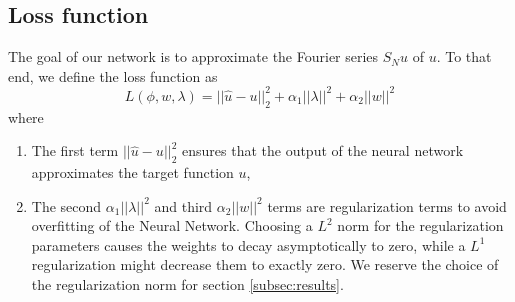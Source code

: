 \documentclass[AMS,STIX1COL]{WileyNJD-v2}
\begin{document}
\subsection{Loss function}
The goal of our network is to approximate the Fourier series $S_N u$ of $u$. To that end, we define the loss function as
 \begin{equation}\label{Eq:lossfunction}
     L(\phi, w, \lambda) = ||\hat{u} - u ||_2^2  + \alpha_1||\lambda||^2 + \alpha_2||w||^2
 \end{equation}
 where
 \begin{enumerate}
     \item The first term $ ||\hat{u} - u ||_2^2$ ensures that the output of the neural network approximates the target function $u$,
     \item The second $\alpha_1||\lambda||^2$  and third $\alpha_2||w||^2$ terms are regularization terms to avoid overfitting of the Neural Network. Choosing a $L^2$ norm for the regularization parameters causes the weights to decay asymptotically to zero, while a $L^1$ regularization might decrease them to exactly zero. We reserve the choice of the regularization norm for section \ref{subsec:results}.
 \end{enumerate}
 
\end{document}
